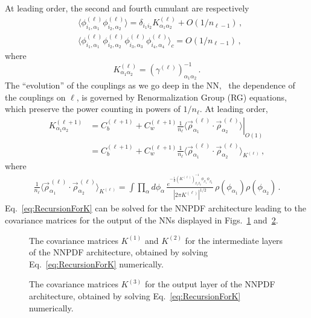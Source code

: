\documentclass[11pt]{article}
\begin{document}
At leading order, the second and fourth cumulant are respectively
\begin{align}
    &\langle \phi^{(\ell)}_{i_1,\alpha_1} \phi^{(\ell)}_{i_2,\alpha_2}\rangle
      = \delta_{i_1 i_2} K^{(\ell)}_{\alpha_1\alpha_2} + O(1/n_{\ell-1})\, , \\
    &\langle \phi^{(\ell)}_{i_1,\alpha_1} \phi^{(\ell)}_{i_2,\alpha_2} 
      \phi^{(\ell)}_{i_3,\alpha_3} \phi^{(\ell)}_{i_4,\alpha_4}\rangle_c 
      = O(1/n_{\ell-1})\, ,
\end{align}
where 
\begin{equation}
    \label{eq:DefineKmat}
    K^{(\ell)}_{\alpha_1\alpha_2} = \left(\gamma^{(\ell)}\right)^{-1}_{\alpha_1\alpha_2}\, .
\end{equation}
The ``evolution'' of the couplings as we go deep in the NN, \ie\ the dependence of the couplings on 
$\ell$, is governed by Renormalization Group (RG) equations, which preserve the power counting in 
powers of $1/n_{\ell}$. At leading order, 
\begin{align}
    K^{(\ell+1)}_{\alpha_1\alpha_2} &= 
      \left. 
      C_b^{(\ell+1)} + C_w^{(\ell+1)} \frac{1}{n_\ell} 
      \langle \vec{\rho}^{\,(\ell)}_{\alpha_1} \cdot
      \vec{\rho}^{\,(\ell)}_{\alpha_2} \rangle 
      \right|_{O(1)} \\
      \label{eq:RecursionForK}
      &= C_b^{(\ell+1)} + C_w^{(\ell+1)} \frac{1}{n_\ell} 
      \langle \vec{\rho}^{\,(\ell)}_{\alpha_1} \cdot
      \vec{\rho}^{\,(\ell)}_{\alpha_2} \rangle_{K^{(\ell)}}\, ,
\end{align}
where
\begin{align*}
    \frac{1}{n_\ell} 
      \langle \vec{\rho}^{\,(\ell)}_{\alpha_1} \cdot
      \vec{\rho}^{\,(\ell)}_{\alpha_2} \rangle_{K^{(\ell)}} = 
    \int \prod_{\alpha}d\phi_\alpha\, 
      \frac{e^{-\frac12 \left(K^{(\ell)}\right)^{-1}_{\beta_1\beta_2}
        \phi_{\beta_1} \phi_{\beta_2}}}
        {\left|2\pi K^{(\ell)}\right|^{1/2}}\,
        \rho(\phi_{\alpha_1}) \rho(\phi_{\alpha_2})\, .
\end{align*}
Eq.~\eqref{eq:RecursionForK} can be solved for the NNPDF architecture leading to the 
covariance matrices for the output of the NNs displayed in 
Figs.~\ref{Fig:KRecursionOne} and~\ref{Fig:KRecursionTwo}.
\begin{figure}[ht]
    \caption{The covariance matrices $K^{(1)}$ and $K^{(2)}$ for the intermediate layers 
    of the NNPDF architecture, obtained by solving Eq.~\eqref{eq:RecursionForK} numerically.
    \label{Fig:KRecursionOne}
    }
\end{figure}
\begin{figure}[ht]
    \caption{The covariance matrices $K^{(3)}$ for the output layer 
    of the NNPDF architecture, obtained by solving Eq.~\eqref{eq:RecursionForK} numerically.
    \label{Fig:KRecursionTwo}
    }
\end{figure}
\end{document}
